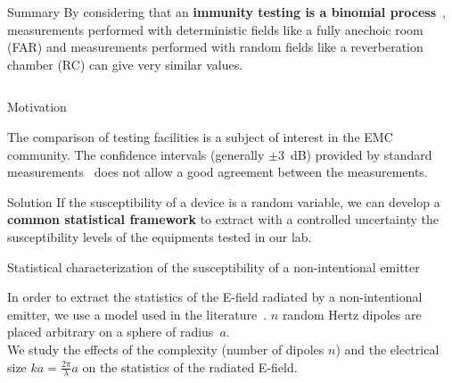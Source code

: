 \documentclass[final,hyperref={pdfpagelabels=false}]{beamer}
\begin{document}
\begin{frame}{}

      \begin{block}{\huge{Summary}}
      \LARGE{By considering that an \textbf{immunity testing is a binomial process}~\cite{Amador13}, measurements performed with deterministic fields like a fully anechoic room (FAR) and measurements performed with random fields like a reverberation chamber (RC) can give very similar values.}  
      \end{block}
  \begin{columns}[t]
% 
    \begin{column}{0.32\linewidth}

	\vspace{-1cm}
      \begin{block}{Motivation}  \justifying
       \large{The comparison of testing facilities is a subject of interest in the EMC community.
	 The confidence intervals (generally $\pm 3$~dB) provided by standard measurements~\cite{IEC21,IEC22} does not allow a good agreement between the measurements.

      }
\end{block}
\begin{center}\begin{minipage}{0.9\textwidth}
	\begin{exampleblock}{{Solution}} \justifying
  \large{If the susceptibility of a device is a random variable, we can develop a \textbf{common statistical framework} to extract with a controlled uncertainty the susceptibility levels of the equipments tested in our lab. }
	\end{exampleblock}
\end{minipage}\end{center}
      \begin{block}{{Statistical characterization of the susceptibility of a non-intentional emitter}} \justifying
        \large{ In order to extract the statistics of the E-field radiated by a non-intentional emitter, we use a model  used in the literature~\cite{Wilson02}. $n$ random Hertz dipoles are placed arbitrary on a sphere of radius~$a$.\\
We study the effects of the complexity (number of dipoles $n$) and the electrical size $ka=\frac{2\pi}{\lambda}a$ on the statistics of the radiated E-field.


}
\end{block}
\end{column}
\end{columns}
\end{frame}
\end{document}
